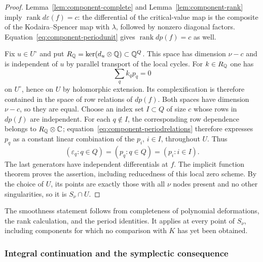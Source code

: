 \begin{proof}
Lemma~\ref{lem:component-complete} and Lemma~\ref{lem:component-rank} imply
$\operatorname{rank} d\varepsilon(f)=c$: the differential of the critical-value map
is the composite of the Kodaira--Spencer map with $\lambda$, followed
by nonzero diagonal factors. Equation~\eqref{eq:component-periodunit} gives
$\operatorname{rank} dp(f)=c$ as well.

Fix $u\in U^\circ$ and put
$R_{\mathbb Q}=\ker(d_u\otimes\mathbb Q)\subset\mathbb Q^Q$. This space has dimension
$\nu-c$ and is independent of $u$ by parallel transport of the local
cycles. For $k\in R_{\mathbb Q}$ one has
\begin{equation}\label{eq:component-periodrelations}
 \sum_q k_qp_q=0
\end{equation}
on $U^\circ$, hence on $U$ by holomorphic extension. Its complexification
is therefore contained in the space of row relations of $dp(f)$.
Both spaces have dimension $\nu-c$, so they are equal.
Choose an index set $I\subset Q$ of size $c$ whose rows in $dp(f)$ are
independent. For each $q\notin I$, the corresponding row dependence
belongs to $R_{\mathbb Q}\otimes\mathbb C$; equation~\eqref{eq:component-periodrelations}
therefore expresses $p_q$ as a constant linear combination of the
$p_i$, $i\in I$, throughout $U$.
Thus
\[
 (\varepsilon_q:q\in Q)=(p_q:q\in Q)=(p_i:i\in I).
\]
The last generators have independent differentials at $f$.
The implicit function theorem proves the assertion, including
reducedness of this local zero scheme. By the choice of $U$, its
points are exactly those with all $\nu$ nodes present and no other
singularities, so it is $S_\nu\cap U$.
\end{proof}

The smoothness statement follows from completeness of polynomial
deformations, the rank calculation, and the period identities.
It applies at every point of $S_\nu$, including components for which
no comparison with $K$ has yet been obtained.

\subsubsection*{Integral continuation and the symplectic consequence}

